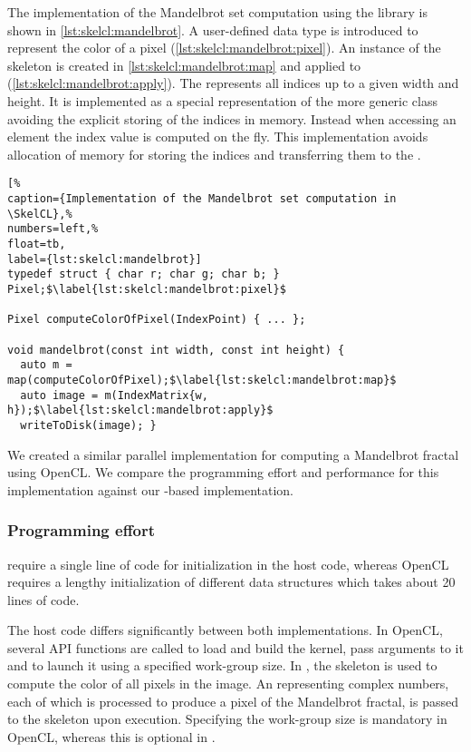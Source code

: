 The implementation of the Mandelbrot set computation using the \SkelCL library is shown in \autoref{lst:skelcl:mandelbrot}.
A user-defined data type is introduced to represent the color of a pixel (\autoref{lst:skelcl:mandelbrot:pixel}).
An instance of the \map skeleton is created in \autoref{lst:skelcl:mandelbrot:map} and applied to  (\autoref{lst:skelcl:mandelbrot:apply}).
The  represents all indices up to a given width and height.
It is implemented as a special representation of the more generic  class avoiding the explicit storing of the indices in memory.
Instead when accessing an element the index value is computed on the fly.
This implementation avoids allocation of memory for storing the indices and transferring them to the \GPU.


\begin{lstlisting}[%                                                             
caption={Implementation of the Mandelbrot set computation in \SkelCL},%
numbers=left,%
float=tb,
label={lst:skelcl:mandelbrot}]
typedef struct { char r; char g; char b; } Pixel;$\label{lst:skelcl:mandelbrot:pixel}$

Pixel computeColorOfPixel(IndexPoint) { ... };

void mandelbrot(const int width, const int height) {
  auto m = map(computeColorOfPixel);$\label{lst:skelcl:mandelbrot:map}$
  auto image = m(IndexMatrix{w, h});$\label{lst:skelcl:mandelbrot:apply}$
  writeToDisk(image); }
\end{lstlisting}

We created a similar parallel implementation for computing a Mandelbrot fractal using OpenCL.
We compare the programming effort and performance for this implementation against our \SkelCL-based implementation.

\subsubsection*{Programming effort}
\label{sec:mandelbrot:programming}

\SkelCL require a single line of code for initialization in the host code, whereas OpenCL requires a lengthy initialization of different data structures which takes about 20 lines of code.

The host code differs significantly between both implementations.
In OpenCL, several API functions are called to load and build the kernel, pass arguments to it and to launch it using a specified work-group size.
In \SkelCL, the \map skeleton is used to compute the color of all pixels in the image.
An  representing complex numbers, each of which is processed to produce a pixel of the Mandelbrot fractal, is passed to the \map skeleton upon execution.
Specifying the work-group size is mandatory in OpenCL, whereas this is optional in \SkelCL.

